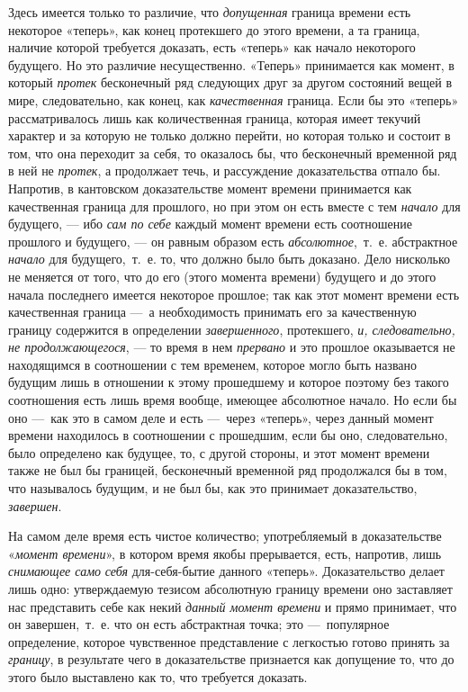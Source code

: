 Здесь имеется только то различие, что {\em допущенная}
граница времени есть некоторое «теперь», как конец протекшего до этого
времени, а та граница, наличие которой требуется доказать, есть «теперь»
как начало некоторого будущего. Но это различие несущественно. «Теперь»
принимается как момент, в который {\em протек}
бесконечный ряд следующих друг за другом состояний вещей в мире,
следовательно, как конец, как {\em качественная}
граница. Если бы это «теперь» рассматривалось лишь как количественная
граница, которая имеет текучий характер и за которую не только должно
перейти, но которая только и состоит в том, что она переходит за себя, то
оказалось бы, что бесконечный временной ряд в ней не
{\em протек}, а продолжает течь, и рассуждение
доказательства отпало бы. Напротив, в кантовском доказательстве момент
времени принимается как качественная граница для прошлого, но при этом он
есть вместе с тем {\em начало} для будущего, — ибо
{\em сам по себе} каждый момент времени есть
соотношение прошлого и будущего, — он равным образом есть
{\em абсолютное},~т.~е. абстрактное
{\em начало} для будущего,~т.~е. то, что должно было
быть доказано. Дело нисколько не меняется от того, что до его (этого
момента времени) будущего и до этого начала последнего имеется некоторое
прошлое; так как этот момент времени есть качественная граница —~а
необходимость принимать его за качественную границу содержится в
определении {\em завершенного}, протекшего,
{\em и, следовательно, не продолжающегося}, — то время
в нем {\em прервано} и это прошлое оказывается не
находящимся в соотношении с тем временем, которое могло быть названо
будущим лишь в отношении к этому прошедшему и которое поэтому без такого
соотношения есть лишь время вообще, имеющее абсолютное начало. Но если бы
оно —~как это в самом деле и есть —~через «теперь», через данный момент
времени находилось в соотношении с прошедшим, если бы оно, следовательно,
было определено как будущее, то, с другой стороны, и этот момент времени
также не был бы границей, бесконечный временной ряд продолжался бы в том,
что называлось будущим, и не был бы, как это принимает доказательство,
{\em завершен}.

На самом деле время есть чистое количество; употребляемый в доказательстве
«{\em момент времени}», в котором время якобы
прерывается, есть, напротив, лишь {\em снимающее само}
{\em себя} для-себя-бытие данного «теперь».
Доказательство делает лишь одно: утверждаемую тезисом абсолютную границу
времени оно заставляет нас представить себе как некий
{\em данный момент времени} и прямо принимает, что он
завершен,~т.~е. что он есть абстрактная точка; это —~популярное
определение, которое чувственное представление с легкостью готово принять
за {\em границу}, в результате чего в доказательстве
признается как допущение то, что до этого было выставлено как то, что
требуется доказать.

